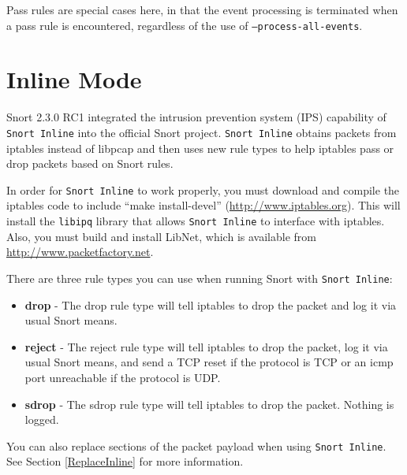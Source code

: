 \documentclass[english]{report}
\newenvironment{note}{
\samepage
    \vspace{10pt}{\textsf{
        {\hspace{7pt}\Huge{$\triangle$\hspace{-12.5pt}{\Large{$^!$}}}}\hspace{5pt}
        {\Large{NOTE}}
    }
    }
   \begin{center}
    \par\vspace{-17pt}

    \begin{lrbox}{\savepar}
    \begin{minipage}[r]{6in}
}
{
    \end{minipage}
    \end{lrbox}
    \fbox{
        \usebox{
            \savepar
	}
    }
    \par\vskip10pt
    \end{center}
}
\newenvironment{note}{
        \begin{rawhtml}
        <p><table border="1"><tr><td><b>
        Note:&nbsp;&nbsp;</b>
        \end{rawhtml}
}{
        \begin{rawhtml}
        </b></td></tr></table></p>
        \end{rawhtml}
}
\begin{document}
\begin{note}

Pass rules are special cases here, in that the event processing is terminated
when a pass rule is encountered, regardless of the use of
\texttt{--process-all-events}.

\end{note}

\section{Inline Mode}
\label{Snort Inline}

Snort 2.3.0 RC1 integrated the intrusion prevention system (IPS) capability of
\texttt{Snort Inline} into the official Snort project. \texttt{Snort Inline}
obtains packets from iptables instead of libpcap and then uses new rule types
to help iptables pass or drop packets based on Snort rules.  

In order for \texttt{Snort Inline} to work properly, you must download and
compile the iptables code to include ``make install-devel''
(\url{http://www.iptables.org}).  This will install the \texttt{libipq} library
that allows \texttt{Snort Inline} to interface with iptables.  Also, you must
build and install LibNet, which is available from
\url{http://www.packetfactory.net}.

There are three rule types you can use when running Snort with \texttt{Snort Inline}:

\begin{itemize}

\item \textbf{drop} - The drop rule type will tell iptables to drop the packet
and log it via usual Snort means.

\item \textbf{reject} - The reject rule type will tell iptables to drop the
packet, log it via usual Snort means, and send a TCP reset if the protocol is
TCP or an icmp port unreachable if the protocol is UDP.

\item \textbf{sdrop} - The sdrop rule type will tell iptables to drop the
packet.  Nothing is logged.

\end{itemize}

\begin{note}

You can also replace sections of the packet payload when using \texttt{Snort
Inline}.  See Section \ref{ReplaceInline} for more information.

\end{note}
\end{document}
